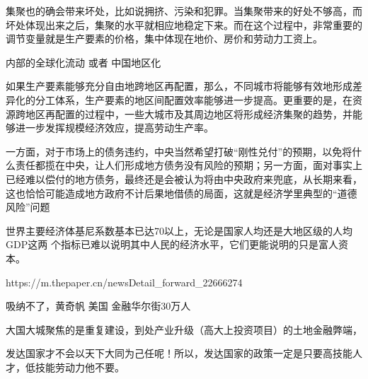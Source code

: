 集聚也的确会带来坏处，比如说拥挤、污染和犯罪。当集聚带来的好处不够高，而坏处体现出来之后，集聚的水平就相应地稳定下来。而在这个过程中，非常重要的调节变量就是生产要素的价格，集中体现在地价、房价和劳动力工资上。


内部的全球化流动 或者 中国地区化

如果生产要素能够充分自由地跨地区再配置，那么，不同城市将能够有效地形成差异化的分工体系，生产要素的地区间配置效率能够进一步提高。更重要的是，在资源跨地区再配置的过程中，一些大城市及其周边地区将形成经济集聚的趋势，并能够进一步发挥规模经济效应，提高劳动生产率。

一方面，对于市场上的债务违约，中央当然希望打破“刚性兑付”的预期，以免将什么责任都揽在中央，让人们形成地方债务没有风险的预期；另一方面，面对事实上已经难以偿付的地方债务，最终还是会被认为将由中央政府来兜底，从长期来看，这也恰恰可能造成地方政府不计后果地借债的局面，这就是经济学里典型的“道德风险”问题


世界主要经济体基尼系数基本已达70以上，无论是国家人均还是大地区级的人均GDP这两
个指标已难以说明其中人民的经济水平，它们更能说明的只是富人资本。

https://m.thepaper.cn/newsDetail_forward_22666274

吸纳不了，黄奇帆 美国 金融华尔街30万人

大国大城聚焦的是重复建设，到处产业升级（高大上投资项目）的土地金融弊端，

发达国家才不会以天下大同为己任呢！所以，发达国家的政策一定是只要高技能人才，低技能劳动力他不要。
